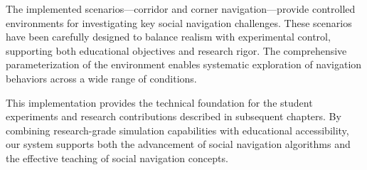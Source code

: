 The implemented scenarios—corridor and corner navigation—provide controlled environments 
for investigating key social navigation challenges. These scenarios have been carefully 
designed to balance realism with experimental control, supporting both educational 
objectives and research rigor. The comprehensive parameterization of the environment 
enables systematic exploration of navigation behaviors across a wide range of conditions.

This implementation provides the technical foundation for the student experiments and 
research contributions described in subsequent chapters. By combining research-grade 
simulation capabilities with educational accessibility, our system supports both the 
advancement of social navigation algorithms and the effective teaching of social 
navigation concepts.